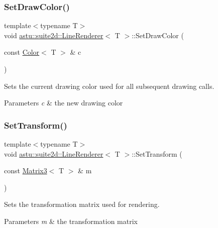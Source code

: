 \subsubsection{\texorpdfstring{Set\+Draw\+Color()}{SetDrawColor()}}
{\footnotesize\ttfamily template$<$typename T$>$ \\
void \hyperlink{classastu_1_1suite2d_1_1LineRenderer}{astu\+::suite2d\+::\+Line\+Renderer}$<$ T $>$\+::Set\+Draw\+Color (\begin{DoxyParamCaption}\item[{const \hyperlink{classastu_1_1Color}{Color}$<$ T $>$ \&}]{c }\end{DoxyParamCaption})\hspace{0.3cm}{\ttfamily [inline]}}

Sets the current drawing color used for all subsequent drawing calls.


\begin{DoxyParams}{Parameters}
{\em c} & the new drawing color \\
\hline
\end{DoxyParams}
\mbox{\label{classastu_1_1suite2d_1_1LineRenderer_a4b8e9cf9ec1af201d4a757bf06efb427}} 
\subsubsection{\texorpdfstring{Set\+Transform()}{SetTransform()}}
{\footnotesize\ttfamily template$<$typename T$>$ \\
void \hyperlink{classastu_1_1suite2d_1_1LineRenderer}{astu\+::suite2d\+::\+Line\+Renderer}$<$ T $>$\+::Set\+Transform (\begin{DoxyParamCaption}\item[{const \hyperlink{classastu_1_1Matrix3}{Matrix3}$<$ T $>$ \&}]{m }\end{DoxyParamCaption})\hspace{0.3cm}{\ttfamily [inline]}}

Sets the transformation matrix used for rendering.


\begin{DoxyParams}{Parameters}
{\em m} & the transformation matrix \\
\hline
\end{DoxyParams}
\mbox{\label{classastu_1_1suite2d_1_1LineRenderer_a3ab4c5bbe44c2f36801800525be62b19}} 

